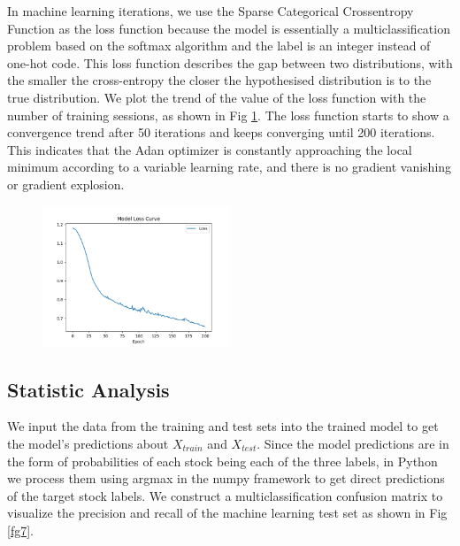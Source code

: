 \documentclass[default,iicol]{sn-jnl}%
\begin{document}
In machine learning iterations, we use the Sparse Categorical Crossentropy Function \cite{2005A} as the loss function because the model is essentially a multiclassification problem based on the softmax algorithm and the label is an integer instead of one-hot code. This loss function describes the gap between two distributions, with the smaller the cross-entropy the closer the hypothesised distribution is to the true distribution. We plot the trend of the value of the loss function with the number of training sessions, as shown in Fig \ref{fg6}. The loss function starts to show a convergence trend after 50 iterations and keeps converging until 200 iterations. This indicates that the Adan optimizer \cite{2014Adam} is constantly approaching the local minimum according to a variable learning rate, and there is no gradient vanishing or gradient explosion.
\begin{figure}[htbp]
	\centering    
	\includegraphics[width = 0.5\textwidth]{figures/Fig 6.png}
	\caption{}
	\label{fg6}
\end{figure} 
\subsection{Statistic Analysis}\label{sec6sub2}
\hspace{1.5em}We input the data from the training and test sets into the trained model to get the model's predictions about $X_{train}$ and $X_{test}$. Since the model predictions are in the form of probabilities of each stock being each of the three labels, in Python we process them using argmax in the numpy framework to get direct predictions of the target stock labels. We construct a multiclassification confusion matrix to visualize the precision and recall of the machine learning test set as shown in Fig \ref{fg7}.
\end{document}
